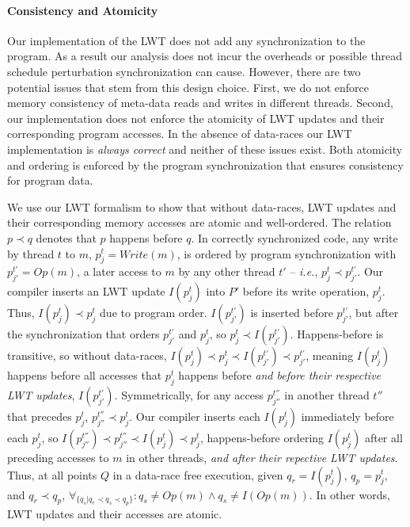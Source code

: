\documentclass[preprint,10pt]{sigplanconf}
\newcommand{\lwt}{LWT\xspace}
\begin{document}
\paragraph{Consistency and Atomicity}

Our implementation of the \lwt does not add any synchronization to the program.
As a result our analysis does not incur the overheads or possible thread
schedule perturbation synchronization can cause.  However, there are two
potential issues that stem from this design choice. First, we do not enforce
memory consistency of meta-data reads and writes in different threads.  Second,
our implementation does not enforce the atomicity of \lwt updates and their
corresponding program accesses.  In the absence of data-races our \lwt
implementation is {\em always correct} and neither of these issues exist.  Both
atomicity and ordering is enforced by the program synchronization that ensures
consistency for program data.   

We use our \lwt formalism to show that without data-races, \lwt updates and
their corresponding memory accesses are atomic and well-ordered.  The relation
$p \prec q$ denotes that $p$ happens before $q$.  In correctly synchronized
code, any write by thread $t$ to $m$, $p^{t}_{j} = Write(m)$, is ordered by
program synchronization with $p^{t'}_{j'} = Op(m)$, a later access to $m$ by
any other thread $t'$ -- {\em i.e.}, $p^{t}_{j} \prec p^{t'}_{j'}$.  Our
compiler inserts an \lwt update $I(p^{t}_{j})$ into $P'$ before its write
operation, $p^{t}_{j}$. Thus, $I(p^{t}_{j}) \prec p^{t}_{j}$ due to program
order.  $I(p^{t'}_{j'})$ is inserted before $p^{t'}_{j'}$, but after the synchronization that orders $p^{t'}_{j'}$ and $p^{t}_{j}$, so $p^{t}_{j} \prec I(p^{t'}_{j'})$.  Happens-before is transitive, so without data-races, $I(p^{t}_{j})
\prec p^{t}_{j} \prec I(p^{t'}_{j'}) \prec p^{t'}_{j'}$, meaning $I(p^{t}_{j})$
happens before all accesses that $p^{t}_{j}$ happens before {\em and before
their respective \lwt updates}, $I(p^{t'}_{j'})$.  Symmetrically, for any
access $p^{t''}_{j''}$ in another thread $t''$ that precedes $p^{t}_{j}$,
$p^{t''}_{j''} \prec p^{t}_{j}$.  Our compiler inserts each $I(p^{t}_{j})$
immediately before each $p^{t}_{j}$, so $I(p^{t''}_{j''}) \prec p^{t''}_{j''}
\prec I(p^{t}_{j}) \prec p^{t}_{j}$, happens-before ordering $I(p^{t}_{j})$
after all preceding accesses to $m$ in other threads, {\em and after their
repective \lwt updates}.  Thus, at all points $Q$ in a data-race free
execution, given $q_r = I(p^{t}_{j})$, $q_p = p^{t}_{j}$, and $q_r \prec q_p$,
$\forall_{ \{q_s | q_r \prec q_s \prec q_p \}}: q_s \ne Op(m) \wedge q_s \ne
I(Op(m)) $.  In other words, \lwt updates and their accesses are atomic.
\end{document}
